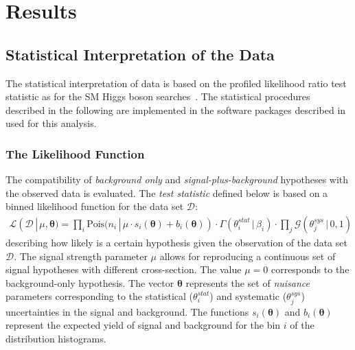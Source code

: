
\section{Results}
\label{sec:result}

\subsection{Statistical Interpretation of the Data}
\label{sec:limits}
The statistical interpretation of data is based on the profiled likelihood ratio test statistic as 
for the SM Higgs boson searches~\cite{lhclimits}. The statistical procedures described in the 
following are implemented in the software packages described in~\cite{roofit,roostat,histfactory} used for this analysis.

\subsubsection{The Likelihood Function}
The compatibility of \textit{background only}  and \textit{signal-plus-background}  hypotheses with the observed data is evaluated.  
The \emph{test statistic} defined below is based on a binned likelihood function for the data set $\mathcal{D}$:
\begin{multline}\label{likelihood}
\mathcal{L}(\mathcal{D}\,|\,\mu, \boldsymbol{\theta}) =  \prod_{i} \text{Pois(} n_i\, |\, \mu \cdot s_i(\boldsymbol{\theta}) 
	+ b_i(\boldsymbol{\theta})) \cdot \Gamma(\theta^{stat}_i \,| \,\beta_i) 
	 \cdot \prod_{j}\mathcal{G}(\theta_j^{sys} \, |\, 0, 1) ~ 
\end{multline}
describing how likely is a certain hypothesis given the observation of the data set $\mathcal{D}$.
The signal strength parameter $\mu$ allows for reproducing a continuous set of signal hypotheses with 
different cross-section. The value  $\mu= 0$ corresponds to the background-only hypothesis. 
The vector $\boldsymbol{\theta}$ represents the set of \emph{nuisance} parameters  corresponding to
the statistical ($\theta^{stat}_i$) and systematic ($\theta_j^{sys}$) uncertainties in  the signal and background. 
The functions $s_i(\boldsymbol{\theta})$ and  $b_i(\boldsymbol{\theta})$
represent the expected yield of signal and background  for the bin $i$ of the \mmc distribution histograms.
